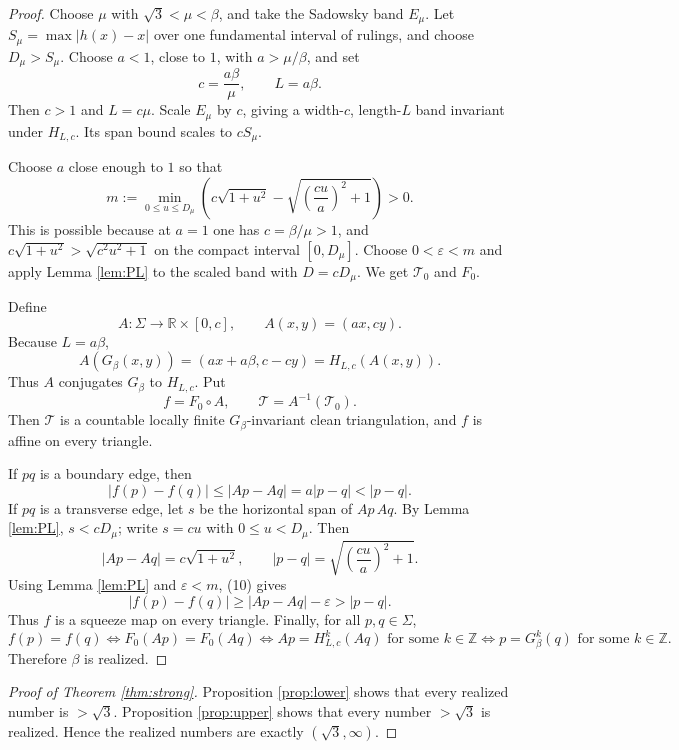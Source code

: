 \documentclass[12pt]{article}
\newcommand{\R}{\mathbb R}
\newcommand{\Z}{\mathbb Z}
\theoremstyle{plain}
\begin{document}
\begin{proof}
Choose \(\mu\) with \(\sqrt3<\mu<\beta\), and take the Sadowsky band
\(E_\mu\).  Let \(S_\mu=\max |h(x)-x|\) over one fundamental interval of
rulings, and choose \(D_\mu>S_\mu\).  Choose \(a<1\), close to \(1\), with
\(a>\mu/\beta\), and set
\[
c=\frac{a\beta}{\mu},\qquad L=a\beta.
\]
Then \(c>1\) and \(L=c\mu\).  Scale \(E_\mu\) by \(c\), giving a width-\(c\),
length-\(L\) band invariant under \(H_{L,c}\).  Its span bound scales to
\(cS_\mu\).

Choose \(a\) close enough to \(1\) so that
\[
m:=\min_{0\le u\le D_\mu}
\left(c\sqrt{1+u^2}-\sqrt{\left(\frac{cu}{a}\right)^2+1}\right)>0. \tag{10}
\]
This is possible because at \(a=1\) one has \(c=\beta/\mu>1\), and
\(c\sqrt{1+u^2}>\sqrt{c^2u^2+1}\) on the compact interval
\([0,D_\mu]\).  Choose \(0<\varepsilon<m\) and apply Lemma \ref{lem:PL} to the
scaled band with \(D=cD_\mu\).  We get \(\mathcal T_0\) and \(F_0\).

Define
\[
A:\Sigma\to\R\times[0,c],\qquad A(x,y)=(ax,cy).
\]
Because \(L=a\beta\),
\[
A(G_\beta(x,y))=(ax+a\beta,c-cy)=H_{L,c}(A(x,y)).
\]
Thus \(A\) conjugates \(G_\beta\) to \(H_{L,c}\).  Put
\[
f=F_0\circ A,\qquad \mathcal T=A^{-1}(\mathcal T_0).
\]
Then \(\mathcal T\) is a countable locally finite \(G_\beta\)-invariant clean
triangulation, and \(f\) is affine on every triangle.

If \(pq\) is a boundary edge, then
\[
|f(p)-f(q)|\le |A p-A q|=a|p-q|<|p-q|.
\]
If \(pq\) is a transverse edge, let \(s\) be the horizontal span of
\(A p\,A q\).  By Lemma \ref{lem:PL}, \(s<cD_\mu\); write \(s=cu\) with
\(0\le u<D_\mu\).  Then
\[
|Ap-Aq|=c\sqrt{1+u^2},\qquad
|p-q|=\sqrt{\left(\frac{cu}{a}\right)^2+1}.
\]
Using Lemma \ref{lem:PL} and \(\varepsilon<m\), (10) gives
\[
|f(p)-f(q)|
\ge |Ap-Aq|-\varepsilon
> |p-q|.
\]
Thus \(f\) is a squeeze map on every triangle.  Finally, for all
\(p,q\in\Sigma\),
\[
f(p)=f(q)
\Longleftrightarrow
F_0(Ap)=F_0(Aq)
\Longleftrightarrow
Ap=H_{L,c}^k(Aq)\text{ for some }k\in\Z
\Longleftrightarrow
p=G_\beta^k(q)\text{ for some }k\in\Z.
\]
Therefore \(\beta\) is realized.
\end{proof}

\begin{proof}[Proof of Theorem \ref{thm:strong}]
Proposition \ref{prop:lower} shows that every realized number is \(>\sqrt3\).
Proposition \ref{prop:upper} shows that every number \(>\sqrt3\) is realized.
Hence the realized numbers are exactly \((\sqrt3,\infty)\).
\end{proof}
\end{document}
